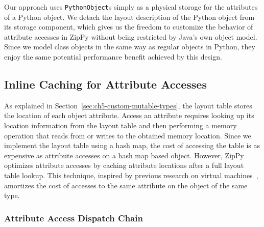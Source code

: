 Our approach uses \texttt{PythonObject}s simply as a physical storage for the attributes of a Python object.
We detach the layout description of the Python object from its storage component, which gives us the freedom to customize the behavior of attribute accesses in ZipPy without being restricted by Java's own object model.
Since we model class objects in the same way as regular objects in Python, they enjoy the same potential performance benefit achieved by this design.

\subsection{Inline Caching for Attribute Accesses}

As explained in Section~\ref{sec:ch5-custom-mutable-types}, the layout table stores the location of each object attribute.
Access an attribute requires looking up its location information from the layout table and then performing a memory operation that reads from or writes to the obtained memory location.
Since we implement the layout table using a hash map, the cost of accessing the table is as expensive as attribute accesses on a hash map based object.
However, ZipPy optimizes attribute accesses by caching attribute locations after a full layout table lookup.
This technique, inspired by previous research on virtual machines~\cite{Deutsch1984, holzle1991, Brunthaler2010inca}, amortizes the cost of accesses to the same attribute on the object of the same type.

\subsubsection{Attribute Access Dispatch Chain}
\label{sec:ch5-attribute-access-dispatch-chain}

